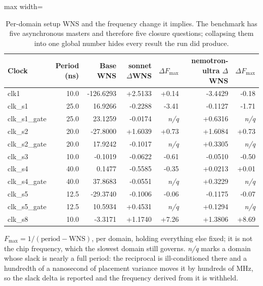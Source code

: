 \begin{table}[htbp]
  \centering
  \footnotesize
  \caption{Per-domain setup WNS and the frequency change it implies. The benchmark has five asynchronous masters and therefore five closure questions; collapsing them into one global number hides every result the run did produce.}
  \label{tab:fmax}
  \begin{adjustbox}{max width=\textwidth}
  \begin{tabular}{lrrrrrr}
    \toprule
    \textbf{Clock} & \textbf{Period (ns)} & \textbf{Base WNS} & \textbf{sonnet $\Delta$WNS} & \textbf{$\Delta F_{\max}$} & \textbf{nemotron-ultra $\Delta$WNS} & \textbf{$\Delta F_{\max}$} \\
    \midrule
    clk1 & 10.0 & -126.6293 & +2.5133 & +0.14 & -3.4429 & -0.18 \\
    clk\_s1 & 25.0 & 16.9266 & -0.2288 & -3.41 & -0.1127 & -1.71 \\
    clk\_s1\_gate & 25.0 & 23.1259 & -0.0174 & \emph{n/q} & +0.6316 & \emph{n/q} \\
    clk\_s2 & 20.0 & -27.8000 & +1.6039 & +0.73 & +1.6084 & +0.73 \\
    clk\_s2\_gate & 20.0 & 17.9242 & -0.1017 & \emph{n/q} & +0.3305 & \emph{n/q} \\
    clk\_s3 & 10.0 & -0.1019 & -0.0622 & -0.61 & -0.0510 & -0.50 \\
    clk\_s4 & 40.0 & 0.1477 & -0.5585 & -0.35 & +0.0213 & +0.01 \\
    clk\_s4\_gate & 40.0 & 37.8683 & -0.0551 & \emph{n/q} & +0.3229 & \emph{n/q} \\
    clk\_s5 & 12.5 & -29.3740 & -0.1006 & -0.06 & -0.1175 & -0.07 \\
    clk\_s5\_gate & 12.5 & 10.5934 & +0.4531 & \emph{n/q} & +0.1294 & \emph{n/q} \\
    clk\_s8 & 10.0 & -3.3171 & +1.1740 & +7.26 & +1.3806 & +8.69 \\
    \bottomrule
  \end{tabular}
  \end{adjustbox}
  \par\smallskip\footnotesize\raggedright $F_{\max}=1/(\text{period}-\text{WNS})$, per domain, holding everything else fixed; it is not the chip frequency, which the slowest domain still governs. \emph{n/q} marks a domain whose slack is nearly a full period: the reciprocal is ill-conditioned there and a hundredth of a nanosecond of placement variance moves it by hundreds of MHz, so the slack delta is reported and the frequency derived from it is withheld.
\end{table}
